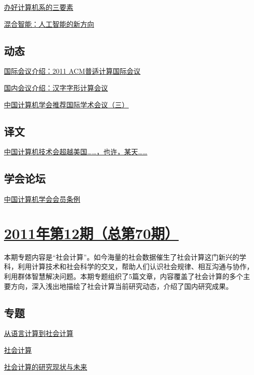 \documentclass[a4paper]{article}
\begin{document}
\href{http://history.ccf.org.cn/resources/1190201776262/2012/01/19/12.pdf}{办好计算机系的三要素}

\href{http://history.ccf.org.cn/resources/1190201776262/2012/01/19/13.pdf}{混合智能：人工智能的新方向}

\subsection{动态}
\href{http://history.ccf.org.cn/resources/1190201776262/2012/01/19/15.pdf}{国际会议介绍：2011 ACM普适计算国际会议}

\href{http://history.ccf.org.cn/resources/1190201776262/2012/01/19/16.pdf}{国内会议介绍：汉字字形计算会议}

\href{http://history.ccf.org.cn/resources/1190201776262/2012/01/19/17.pdf}{中国计算机学会推荐国际学术会议（三）}

\subsection{译文}
\href{http://history.ccf.org.cn/resources/1190201776262/2012/07/23/18.pdf}{中国计算机技术会超越美国……，也许，某天……}

\subsection{学会论坛}
\href{http://history.ccf.org.cn/resources/1190201776262/2012/01/19/19.pdf}{中国计算机学会会员条例}


\section{\href{http://history.ccf.org.cn/sites/ccf/jsjtbbd.jsp?contentId=2651625261838}{\textbf{2011年第12期（总第70期）}}}
本期专题内容是“社会计算”。如今海量的社会数据催生了社会计算这门新兴的学科，利用计算技术和社会科学的交叉，帮助人们认识社会规律、相互沟通与协作，利用群体智慧解决问题。本期专题组织了5篇文章，内容覆盖了社会计算的多个主要方向，深入浅出地描绘了社会计算当前研究动态，介绍了国内研究成果。
\subsection{专题}
\href{http://history.ccf.org.cn/resources/1190201776262/2012/01/06/6.pdf}{从语言计算到社会计算}

\href{http://history.ccf.org.cn/resources/1190201776262/2012/01/06/1.pdf}{社会计算}

\href{http://history.ccf.org.cn/resources/1190201776262/2012/01/06/2.pdf}{社会计算的研究现状与未来}
\end{document}
